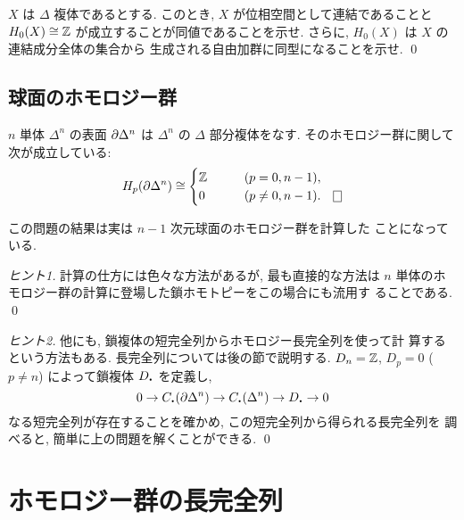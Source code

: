 \documentclass[12pt,twoside]{jarticle}
\begin{document}
\begin{question}[$0$次のホモロジー群の幾何学的意味]
 $X$ は $\Delta$ 複体であるとする. 
 このとき, $X$ が位相空間として連結であることと %
 $H_0(X) \cong {\mathbb Z}$ が成立することが同値であることを示せ. 
 さらに, $H_0(X)$ は $X$ の連結成分全体の集合から
 生成される自由加群に同型になることを示せ.  \qed
\end{question}


\subsection{球面のホモロジー群}

\begin{question}\qstar{*}
 $n$ 単体 $\Delta^n$ の表面 $\partial\Delta^n$ は $\Delta^n$ の $\Delta$ 
 部分複体をなす. そのホモロジー群に関して次が成立している:
 \[
  H_p(\bdr\Delta^n) \isom
  \begin{cases}
   \Z  & \qquad (p = 0,n-1),     \\
   0   & \qquad (p \ne 0, n-1). \qed
  \end{cases}
 \]
\end{question}

\noindent この問題の結果は実は $n-1$ 次元球面のホモロジー群を計算した
ことになっている.

\begin{proof}[ヒント1]
計算の仕方には色々な方法があるが, 最も直接的な方法は
$n$ 単体のホモロジー群の計算に登場した鎖ホモトピーをこの場合にも流用す
ることである. \qed
\end{proof}

\begin{proof}[ヒント2]
他にも, 鎖複体の短完全列からホモロジー長完全列を使って計
算するという方法もある. 長完全列については後の節で説明する. %
$D_n = {\mathbb Z}$, $D_p = 0$ ($p\ne n$) によって鎖複体 $D_\bcdot$ を定義し,
\[
  0 \to C_\bcdot(\bdr \Delta^n)
    \to C_\bcdot(\Delta^n)
    \to D_\bcdot
    \to 0
\] %
なる短完全列が存在することを確かめ, この短完全列から得られる長完全列を
調べると, 簡単に上の問題を解くことができる. \qed
\end{proof}


\section{ホモロジー群の長完全列}
\end{document}
